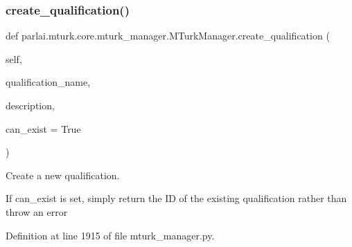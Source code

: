 \mbox{\label{classparlai_1_1mturk_1_1core_1_1mturk__manager_1_1MTurkManager_a663af5f8cfa1c984439c2344d528f223}} 
\subsubsection{\texorpdfstring{create\+\_\+qualification()}{create\_qualification()}}
{\footnotesize\ttfamily def parlai.\+mturk.\+core.\+mturk\+\_\+manager.\+M\+Turk\+Manager.\+create\+\_\+qualification (\begin{DoxyParamCaption}\item[{}]{self,  }\item[{}]{qualification\+\_\+name,  }\item[{}]{description,  }\item[{}]{can\+\_\+exist = {\ttfamily True} }\end{DoxyParamCaption})}

\begin{DoxyVerb}Create a new qualification.

If can_exist is set, simply return the ID of the existing qualification rather
than throw an error
\end{DoxyVerb}
 

Definition at line 1915 of file mturk\+\_\+manager.\+py.


